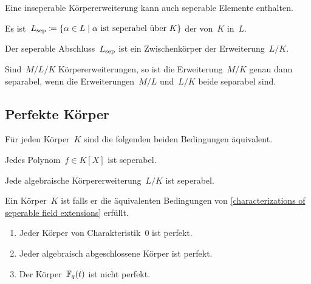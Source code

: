 \begin{warning}
  Eine inseperable Körpererweiterung kann auch seperable Elemente enthalten.
\end{warning}

\begin{definition}
  Es ist~$L_{\sep} \defined \{ \alpha \in L \suchthat \text{$\alpha$ ist seperabel über~$K$} \}$ der  von~$K$ in~$L$.
\end{definition}

\begin{proposition}
  Der seperable Abschluss~$L_{\mathrm{sep}}$ ist ein Zwischenkörper der Erweiterung~$L/K$.
\end{proposition}

\begin{proposition}
  Sind~$M/L/K$ Körpererweiterungen, so ist die Erweiterung~$M/K$ genau dann separabel, wenn die Erweiterungen~$M/L$ und~$L/K$ beide separabel sind.
\end{proposition}



\subsection{Perfekte Körper}

\begin{proposition}
  \label{characterizations of seperable field extensions}
  Für jeden Körper~$K$ sind die folgenden beiden Bedingungen äquivalent.
  \begin{equivlist}
    \item
      Jedes Polynom~$f \in K[X]$ ist seperabel.
    \item
      Jede algebraische Körpererweiterung~$L/K$ ist seperabel.
  \end{equivlist}
\end{proposition}

\begin{definition}
  Ein Körper~$K$ ist  falls er die äquivalenten Bedingungen von \cref{characterizations of seperable field extensions} erfüllt. 
\end{definition}

\begin{example}
  \leavevmode
  \begin{enumerate}
    \item
      Jeder Körper von Charakteristik~$0$ ist perfekt.
    \item
      Jeder algebraisch abgeschlossene Körper ist perfekt.
    \item
      Der Körper~$\mathbb{F}_q(t)$ ist nicht perfekt.
  \end{enumerate}
\end{example}



